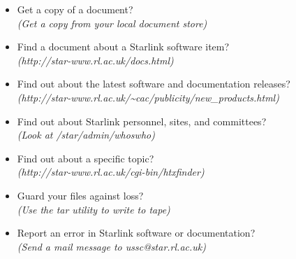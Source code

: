 \documentclass[twoside]{article}
\newcommand{\htmladdnormallink}[2]{#1}
\begin{document}
\begin{itemize}
\hspace*{10mm} {\em (Ask your Site Manager, or look in your Local Guide)}
\item Get a copy of a document?\\
\hspace*{10mm} {\em (Get a copy from your local document store)}
\item Find a document about a Starlink software item?\\
\hspace*{10mm} {\em (\htmladdnormallink{http://star-www.rl.ac.uk/docs.html}
{http://star-www.rl.ac.uk/docs.html})}
\item Find out about the latest software and documentation releases?\\
\hspace*{10mm}
{\em (http://star-www.rl.ac.uk/\~{}cac/publicity/new\_products.html)}
\item Find out about Starlink personnel, sites, and committees?\\
\hspace*{10mm} {\em (Look at /star/\-admin/\-whoswho)}
\item Find out about a specific topic?\\
\hspace*{10mm} {\em (\htmladdnormallink{http://star-www.rl.ac.uk/cgi-bin/htxfinder}
{http://star-www.rl.ac.uk/cgi-bin/htxfinder})}
\item Guard your files against loss?\\
\hspace*{10mm} {\em (Use the tar utility to write to tape)}
\item Report an error in Starlink software or documentation?\\
\hspace*{10mm} {\em (Send a mail message to ussc@star.rl.ac.uk)}
\end{itemize}
\end{document}

